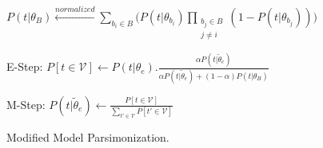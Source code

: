 \begin{algorithm}[t!]
\begin{algorithmic}[1]
     \State \begin{small}$P(t|\theta_B) \xleftarrow{normalized} \sum_{b_i\in B} \bigg(P(t|\theta_{b_i}) \prod_{\substack{b_j\in B \\ j \neq i}} (1-P(t|\theta_{b_j}))\bigg)$ \end{small}
     \Repeat
         \State \begin{small}E-Step: $P[t\in \mathcal{V}] \gets P(t|\theta_e).\frac{\alpha P(t|\tilde{\theta}_e)}{\alpha P(t|\tilde{\theta}_e) + (1-\alpha) P(t|\theta_B)}$ \end{small}
          \State \begin{small}M-Step: $P(t|\tilde{\theta}_e) \gets \frac{ P[t \in \mathcal{V}]}{\sum_{t' \in \mathcal{V}} P[t' \in \mathcal{V}]}$ \end{small}
 \EndFor
 \EndProcedure
 \end{algorithmic}
 \caption{\label{alg:model_parsimonization}Modified Model Parsimonization.}
\end{algorithm}
